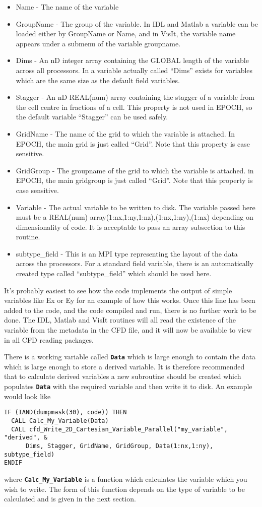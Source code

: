 \documentclass[12pt,a4paper]{article}
\newcommand{\simpleboxverbatim}{\begin{Verbatim}[obeytabs=true,frame=single,
  framerule=0.5mm,rulecolor=\color{warwickmid},formatcom=\color{black}]}
\newcommand{\inlinecode}[1]{{\color{warwickred} \bf\texttt{#1}}}
\newcommand{\EPOCH}{{\color{warwickdark}\fontfamily{phv}\selectfont{EPOCH}}}
\begin{document}
\begin{itemize}
\item Name - The name of the variable
\item GroupName - The group of the variable. In IDL and Matlab a variable can
  be loaded either by GroupName or Name, and in VisIt, the variable name
  appears under a submenu of the variable groupname.
\item Dims - An nD integer array containing the GLOBAL length of the variable
  across all processors. In {\EPOCH} a variable actually called ``Dims'' exists
  for variables which are the same size as the default field variables.
\item Stagger - An nD REAL(num) array containing the stagger of a variable from
  the cell centre in fractions of a cell. This property is not used in EPOCH,
  so the default variable ``Stagger'' can be used safely.
\item GridName - The name of the grid to which the variable is attached. In
  EPOCH, the main grid is just called ``Grid''. Note that this property is case
  sensitive.
\item GridGroup - The groupname of the grid to which the variable is
  attached. in EPOCH, the main gridgroup is just called ``Grid''. Note that
  this property is case sensitive.
\item Variable - The actual variable to be written to disk. The variable passed
  here must be a REAL(num) array(1:nx,1:ny,1:nz),(1:nx,1:ny),(1:nx) depending
  on dimensionality of code. It is acceptable to pass an array subsection to
  this routine.
\item subtype\_field - This is an MPI type representing the layout of the data
  across the processors. For a standard field variable, there is an
  automatically created type called ``subtype\_field'' which should be used
  here.
\end{itemize}

It's probably easiest to see how the code implements the output of simple
variables like Ex or Ey for an example of how this works. Once this line has
been added to the code, and the code compiled and run, there is no further work
to be done. The IDL, Matlab and VisIt routines will all read the existence of
the variable from the metadata in the CFD file, and it will now be available to
view in all CFD reading packages.

There is a working variable called \inlinecode{Data} which is large enough to
contain the data which is large enough to store a derived variable. It is
therefore recommended that to calculate derived variables a new subroutine
should be created which populates \inlinecode{Data} with the required variable
and then write it to disk. An example would look like
\simpleboxverbatim
IF (IAND(dumpmask(30), code)) THEN
  CALL Calc_My_Variable(Data)
  CALL cfd_Write_2D_Cartesian_Variable_Parallel("my_variable", "derived", &
      Dims, Stagger, GridName, GridGroup, Data(1:nx,1:ny), subtype_field)
ENDIF
\end{Verbatim}
where \inlinecode{Calc\_My\_Variable} is a function which calculates the
variable which you wish to write. The form of this function depends on the type
of variable to be calculated and is given in the next section.
\end{document}
